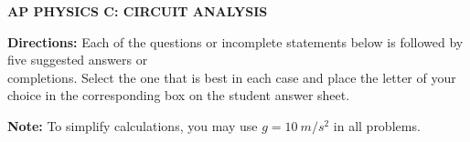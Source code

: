 \documentclass[11pt]{article}
\begin{document}
\pagestyle{fancy}
\chead{}
\lfoot{}\cfoot{-\textsf{\textbf{\thepage}}-}

\begin{center}
  \vspace{-.35in}
  {\large
    \textbf{AP PHYSICS C: CIRCUIT ANALYSIS}
  }
\end{center}

\textbf{Directions:} Each of the questions or incomplete statements below is
followed by five suggested answers or\\
completions. Select the one that is best
in each case and place the letter of your choice in the corresponding box on
the student answer sheet.

\vspace{10pt}\textbf{Note:} To simplify calculations, you may use
$g=\SI{10}{m/s^2}$ in all problems.
\end{document}
